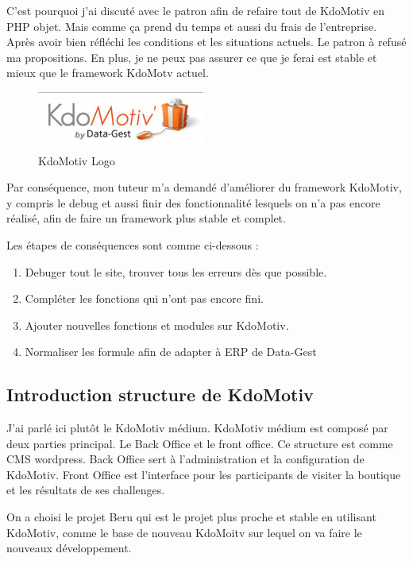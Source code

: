 C'est pourquoi j'ai discuté avec le patron afin de refaire tout de KdoMotiv en PHP objet. Mais comme ça prend du temps et aussi du frais de l'entreprise. Après avoir bien réfléchi les conditions et les situations actuels. Le patron à refusé ma propositions. En plus, je ne peux pas assurer ce que je ferai est stable et mieux que le framework KdoMotv actuel. 

\begin{figure}[hbtp]
\center
\includegraphics[scale=1]{body/images/kdomotiv.png}
\caption{KdoMotiv Logo}
\end{figure}


Par conséquence, mon tuteur m'a demandé d'améliorer du framework KdoMotiv, y compris le debug et aussi finir des fonctionnalité lesquels on n'a pas encore réalisé, afin de faire un framework plus stable et complet.

Les étapes de conséquences sont comme ci-dessous : 
\begin{enumerate}
\item Debuger tout le site, trouver tous les erreurs dès que possible.
\item Compléter les fonctions qui n'ont pas encore fini.
\item Ajouter nouvelles fonctions et modules sur KdoMotiv.
\item Normaliser les formule afin de adapter à ERP de Data-Gest  
\end{enumerate}

\subsection{Introduction structure de KdoMotiv}
J'ai parlé ici plutôt le KdoMotiv médium. KdoMotiv médium est composé par deux parties principal. Le Back Office et le front office. Ce structure est comme CMS wordpress. Back Office sert à l'administration et la configuration de KdoMotiv. Front Office est l'interface pour les participants de visiter la boutique et les résultats de ses challenges.

On a choisi le projet Beru qui est le projet plus proche et stable en utilisant KdoMotiv, comme le base de nouveau KdoMoitv sur lequel on va faire le nouveaux développement.



